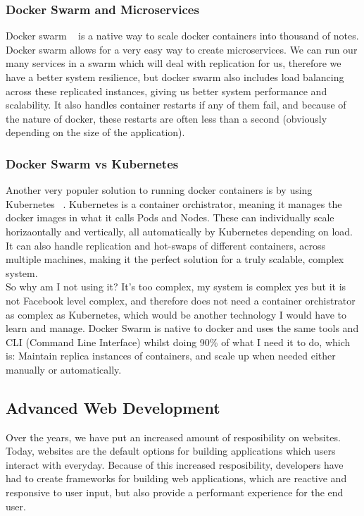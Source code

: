 \documentclass[titlepage]{article}
\begin{document}
\subsubsection{Docker Swarm and Microservices}
Docker swarm ~\cite{docker_swarm} is a native way to scale docker containers into thousand of notes. Docker swarm allows for a very easy way to create microservices. We can run our many services in a swarm which will deal with replication for us, therefore we have a better system resilience, but docker swarm also includes load balancing across these replicated instances, giving us better system performance and scalability. It also handles container restarts if any of them fail, and because of the nature of docker, these restarts are often less than a second (obviously depending on the size of the application).

\subsubsection{Docker Swarm vs Kubernetes}
Another very populer solution to running docker containers is by using Kubernetes ~\cite{kubernetes}. Kubernetes is a container orchistrator, meaning it manages the docker images in what it calls Pods and Nodes. These can individually scale horizaontally and vertically, all automatically by Kubernetes depending on load. It can also handle replication and hot-swaps of different containers, across multiple machines, making it the perfect solution for a truly scalable, complex system. \\

So why am I not using it? It's too complex, my system is complex yes but it is not Facebook level complex, and therefore does not need a container orchistrator as complex as Kubernetes, which would be another technology I would have to learn and manage. Docker Swarm is native to docker and uses the same tools and CLI (Command Line Interface) whilst doing 90\% of what I need it to do, which is: Maintain replica instances of containers, and scale up when needed either manually or automatically. \\

\subsection{Advanced Web Development}
Over the years, we have put an increased amount of resposibility on websites. Today, websites are the default options for building applications which users interact with everyday. Because of this increased resposibility, developers have had to create frameworks for building web applications, which are reactive and responsive to user input, but also provide a performant experience for the end user.
\end{document}
